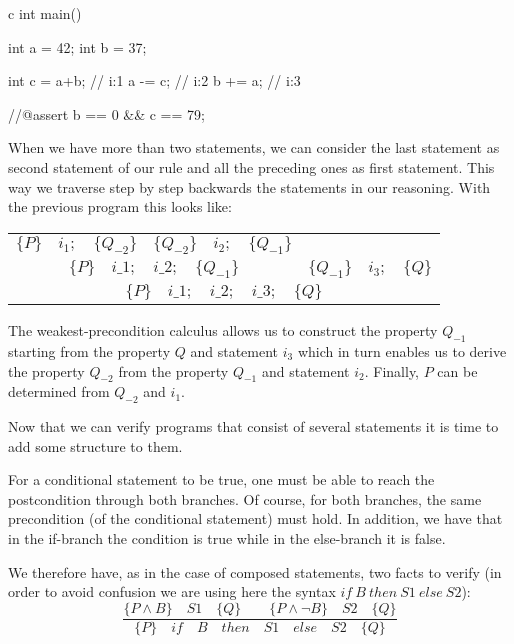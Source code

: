 \begin{CodeBlock}{c}
int main(){
  int a = 42;
  int b = 37;

  int c = a+b; // i:1
  a -= c;      // i:2
  b += a;      // i:3

  //@assert b == 0 && c == 79;
}
\end{CodeBlock}





When we have more than two statements, we can consider the last
statement as second statement of our rule and all the preceding ones as
first statement. This way we traverse step by step backwards the
statements in our reasoning. With the previous program this looks like:


\begin{center}
\begin{tabular}{ccc}
  $\{P\}\quad i_1 ; \quad \{Q_{-2}\}$ & $\{Q_{-2}\}\quad i_2 ; \quad \{Q_{-1}\}$ & \\
  \cline{1-2}
  \multicolumn{2}{c}{$\{P\}\quad i\_1 ; \quad i\_2 ; \quad \{Q_{-1}\}$} & $\{Q_{-1}\} \quad i_3 ; \quad \{Q\}$\\
  \hline
  \multicolumn{3}{c}{$\{P\}\quad i\_1 ; \quad i\_2 ; \quad i\_3; \quad \{ Q \}$}
\end{tabular}
\end{center}

The weakest-precondition calculus allows us to construct the property
$Q_{-1}$ starting from the property $Q$ and statement $i_3$ which
in turn enables us to derive the property $Q_{-2}$ from the property
$Q_{-1}$ and statement $i_2$. Finally, $P$ can be determined from
$Q_{-2}$ and $i_1$.



Now that we can verify programs that consist of several statements it
is time to add some structure to them.





For a conditional statement to be true, one must be able to reach the
postcondition through both branches. Of course, for both branches, the
same precondition (of the conditional statement) must hold. In addition,
we have that in the if-branch the condition is true while in the
else-branch it is false.

We therefore have, as in the case of composed statements, two facts to
verify (in order to avoid confusion we are using here the syntax
$if\ B\ then\ S1\ else\ S2$):
$$\dfrac{\{P \wedge B\}\quad S1\quad \{Q\} \quad \quad \{P \wedge \neg B\}\quad S2\quad \{Q\}}{\{P\}\quad if\quad B\quad then\quad S1\quad else\quad S2 \quad \{Q\}}$$

